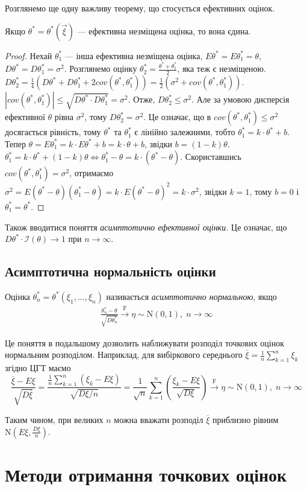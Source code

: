 Розглянемо ще одну важливу теорему, що стосується ефективних оцінок.
\begin{theorem*}
    Якщо $\theta^* = \theta^* (\vec{\xi})$ --- ефективна незміщена оцінка, то вона єдина.
\end{theorem*}
\begin{proof}
    Нехай $\theta_1^*$ --- інша ефективна незміщена оцінка, $E\theta^* = E\theta_1^* = \theta$,
    $D\theta^* = D\theta_1^* = \sigma^2$. Розглянемо оцінку $\theta_2^* = \frac{\theta^* + \theta_1^*}{2}$, яка теж є незміщеною.
    $D\theta_2^* = \frac{1}{4}\left(D\theta^* + D\theta_1^* + 2{cov}(\theta^*, \theta_1^*) \right) = \frac{1}{2}\left( \sigma^2 + {cov}(\theta^*, \theta_1^*)\right)$.
    $\left|{cov}(\theta^*, \theta_1^*) \right| \leq \sqrt{D\theta^* \cdot D\theta_1^*} = \sigma^2$.
    Отже, $D\theta_2^* \leq \sigma^2$. Але за умовою дисперсія ефективної $\theta$ рівна $\sigma^2$, тому $D\theta_2^* = \sigma^2$.
    Це означає, що в ${cov}(\theta^*, \theta_1^*) \leq \sigma^2$ досягається рівність, тому $\theta^*$ та $\theta_1^*$ є лінійно залежними, тобто
    $\theta_1^* = k\cdot \theta^* + b$. Тепер $\theta = E\theta_1^* = k\cdot E\theta^* + b = k\cdot \theta + b$, звідки $b = (1-k)\theta$.
    $\theta_1^* = k\cdot \theta^* + (1-k)\theta \Leftrightarrow \theta_1^* - \theta = k \cdot \left(\theta^* - \theta \right)$.
    Скориставшись ${cov}(\theta^*, \theta_1^*) = \sigma^2$, отримаємо 
    $\sigma^2 = E\left(\theta^* - \theta \right)\left(\theta_1^* - \theta \right) = k \cdot E\left(\theta^* - \theta \right)^2 = k \cdot \sigma^2$,
    звідки $k = 1$, тому $b = 0$ і $\theta^*_1 = \theta^*$.
\end{proof}

Також вводитися поняття \emph{асимптотично ефективної оцінки.} Це означає, що 
$D\theta^* \cdot \mathcal{I}(\theta) \to 1$ при $n\to\infty$.

\subsection{Асимптотична нормальність оцінки}
\begin{definition}
    Оцінка $\theta_n^* = \theta^* (\xi_1, ..., \xi_n)$ називається \emph{асимптотично нормальною}, якщо 
    \begin{gather}
        \frac{\theta_n^* - \theta}{\sqrt{D\theta_n^*}} \overset{\mathrm{F}}{\longrightarrow} \eta \sim \mathrm{N}(0, 1), \; n \to \infty
    \end{gather}
\end{definition}
Це поняття в подальшому дозволить наближувати розподіл точкових оцінок нормальним розподілом.
Наприклад, для вибіркового середнього $\overline{\xi} = \frac{1}{n} \sum\limits_{k=1}^n \xi_k$ згідно ЦГТ маємо
$$ 
\frac{\overline{\xi} - E\xi}{\sqrt{D\overline{\xi}}} = \frac{\frac{1}{n} \sum\limits_{k=1}^n (\xi_k  -E\xi)}{\sqrt{D\xi/n}} = 
\frac{1}{\sqrt{n}} \sum\limits_{k=1}^n \left(\frac{\xi_k - E\xi}{\sqrt{D\xi}} \right)
\overset{\mathrm{F}}{\longrightarrow} \eta \sim \mathrm{N}(0, 1), \; n \to \infty
$$

Таким чином, при великих $n$ можна вважати розподіл $\overline{\xi}$ приблизно рівним $ \mathrm{N} \left(E\xi, \frac{D\xi}{n}\right)$.

\section{Методи отримання точкових оцінок}